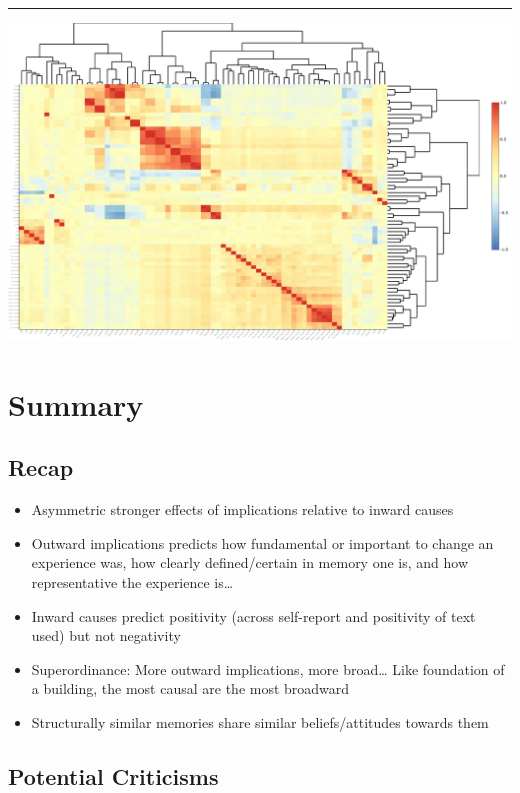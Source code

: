 \documentclass[
  .7em,
  letterpaper,
  DIV=11,
  numbers=noendperiod]{scrartcl}
\begin{document}
\begin{center}\rule{0.5\linewidth}{0.5pt}\end{center}

\includegraphics{EpMemNet_LabPres_htmldoc_files/figure-pdf/unnamed-chunk-69-1.pdf}

\hypertarget{summary}{%
\section{Summary}\label{summary}}

\hypertarget{recap}{%
\subsection{Recap}\label{recap}}

\begin{itemize}
\item
  Asymmetric stronger effects of implications relative to inward causes
\item
  Outward implications predicts how fundamental or important to change
  an experience was, how clearly defined/certain in memory one is, and
  how representative the experience is\ldots{}
\item
  Inward causes predict positivity (across self-report and positivity of
  text used) but not negativity
\item
  Superordinance: More outward implications, more broad\ldots{} Like
  foundation of a building, the most causal are the most broadward
\item
  Structurally similar memories share similar beliefs/attitudes towards
  them
\end{itemize}

\hypertarget{potential-criticisms}{%
\subsection{Potential Criticisms}\label{potential-criticisms}}
\end{document}
